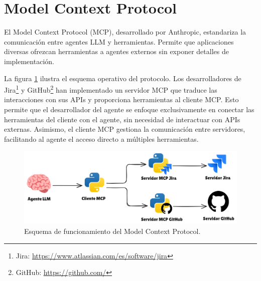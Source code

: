 \section{Model Context Protocol}
El Model Context Protocol (MCP), desarrollado por Anthropic, estandariza la comunicación entre agentes LLM y herramientas. Permite que aplicaciones diversas ofrezcan herramientas a agentes externos sin exponer detalles de implementación\cite{noauthor_model_nodate}.

La figura \ref{fig:mcp} ilustra el esquema operativo del protocolo. Los desarrolladores de Jira\footnote{Jira: \url{https://www.atlassian.com/es/software/jira}} y GitHub\footnote{GitHub: \url{https://github.com/}} han implementado un servidor MCP que traduce las interacciones con sus APIs y proporciona herramientas al cliente MCP. Esto permite que el desarrollador del agente se enfoque exclusivamente en conectar las herramientas del cliente con el agente, sin necesidad de interactuar con APIs externas. Asimismo, el cliente MCP gestiona la comunicación entre servidores, facilitando al agente el acceso directo a múltiples herramientas.

\begin{figure}[H]
  \centering
  \includegraphics[width=1\linewidth]{figures/mcp.png}
  \caption{Esquema de funcionamiento del Model Context Protocol.}
  \label{fig:mcp}
\end{figure}


